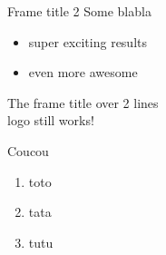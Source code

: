 \documentclass[presentation, aspectratio=169]{beamer}
\begin{document}
\begin{frame}[label={sec:orgd31d4bd}]{Frame title 2}
Some blabla
\begin{itemize}
\item super exciting results
\item even more awesome
\end{itemize}
\end{frame}

\begin{frame}[label={sec:org60974c3}]{The frame title over 2 lines \\  logo still works!}
\begin{exampleblock}{Coucou}
\begin{enumerate}
\item toto
\item tata
\item tutu
\end{enumerate}
\end{exampleblock}
\end{frame}
\end{document}
